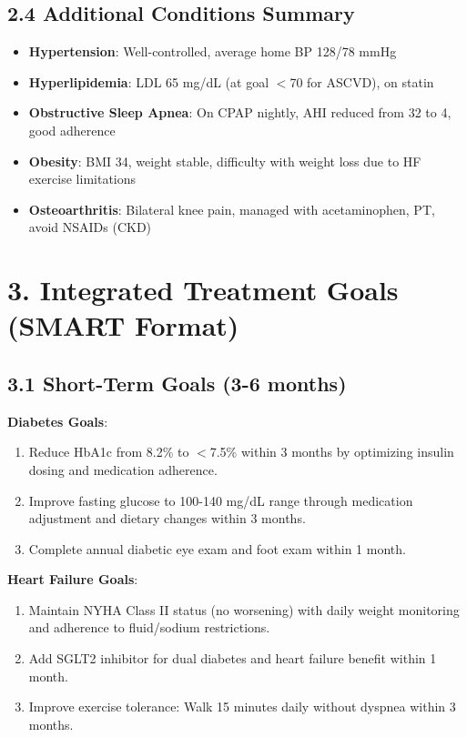 \documentclass[11pt,letterpaper]{article}
\begin{document}
\subsection*{2.4 Additional Conditions Summary}

\begin{itemize}[leftmargin=*]
    \item \textbf{Hypertension}: Well-controlled, average home BP 128/78 mmHg
    \item \textbf{Hyperlipidemia}: LDL 65 mg/dL (at goal $<$70 for ASCVD), on statin
    \item \textbf{Obstructive Sleep Apnea}: On CPAP nightly, AHI reduced from 32 to 4, good adherence
    \item \textbf{Obesity}: BMI 34, weight stable, difficulty with weight loss due to HF exercise limitations
    \item \textbf{Osteoarthritis}: Bilateral knee pain, managed with acetaminophen, PT, avoid NSAIDs (CKD)
\end{itemize}

\section*{3. Integrated Treatment Goals (SMART Format)}

\subsection*{3.1 Short-Term Goals (3-6 months)}

\textbf{Diabetes Goals}:
\begin{enumerate}[leftmargin=*]
    \item Reduce HbA1c from 8.2\% to $<$7.5\% within 3 months by optimizing insulin dosing and medication adherence.
    \item Improve fasting glucose to 100-140 mg/dL range through medication adjustment and dietary changes within 3 months.
    \item Complete annual diabetic eye exam and foot exam within 1 month.
\end{enumerate}

\textbf{Heart Failure Goals}:
\begin{enumerate}[leftmargin=*]
    \item Maintain NYHA Class II status (no worsening) with daily weight monitoring and adherence to fluid/sodium restrictions.
    \item Add SGLT2 inhibitor for dual diabetes and heart failure benefit within 1 month.
    \item Improve exercise tolerance: Walk 15 minutes daily without dyspnea within 3 months.
\end{enumerate}
\end{document}

